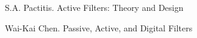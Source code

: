 \documentclass[informe.tex]{subfiles}
\begin{document}
S.A. Pactitis. Active Filters: Theory and Design\newline

Wai-Kai Chen. Passive, Active, and Digital Filters\newline
\end{document}
